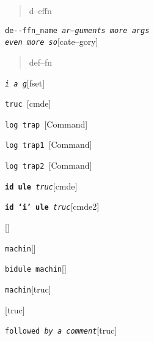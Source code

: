 \documentclass{book}
\newcommand\GNUTexinfocommandstyletextvar[1]{{\normalfont{}\textsl{#1}}}%
\begin{document}
\begin{titlepage}
%
\begin{quote}
\unskip{\parskip=0pt\noindent}%
d--effn
\end{quote}

\noindent\texttt{de{-}{-}ffn\_name \EmbracOn{}\textnormal{\textsl{ar--guments    more args \leavevmode{}\\ even more so}}\EmbracOff{}}\hfill[cate--gory]

%
\begin{quote}
\unskip{\parskip=0pt\noindent}%
def--fn
\end{quote}

\noindent\texttt{\GNUTexinfocommandstyletextvar{i} \EmbracOn{}\textnormal{\textsl{a g}}\EmbracOff{}}\hfill[fset]

\index[fn]{i@\texttt{\GNUTexinfocommandstyletextvar{i}}}%
%
\noindent\texttt{truc \EmbracOn{}\textnormal{\textsl{}}\EmbracOff{}}\hfill[cmde]

%
\noindent\texttt{log trap \EmbracOn{}\textnormal{\textsl{}}\EmbracOff{}}\hfill[Command]

%
\noindent\texttt{log trap1 \EmbracOn{}\textnormal{\textsl{}}\EmbracOff{}}\hfill[Command]

%
\noindent\texttt{log trap2 \EmbracOn{}\textnormal{\textsl{}}\EmbracOff{}}\hfill[Command]

%
\noindent\texttt{\textbf{id ule} \EmbracOn{}\textnormal{\textsl{truc}}\EmbracOff{}}\hfill[cmde]

%
\noindent\texttt{\textbf{id `\texttt{i}' ule} \EmbracOn{}\textnormal{\textsl{truc}}\EmbracOff{}}\hfill[cmde2]

%
\noindent\texttt{}\hfill[]

\noindent\texttt{machin}\hfill[]

%
\noindent\texttt{bidule machin}\hfill[]

%
\noindent\texttt{machin}\hfill[truc]

%
\noindent\texttt{}\hfill[truc]

\noindent\texttt{followed \EmbracOn{}\textnormal{\textsl{by a comment}}\EmbracOff{}}\hfill[truc]


\end{titlepage}
\end{document}

